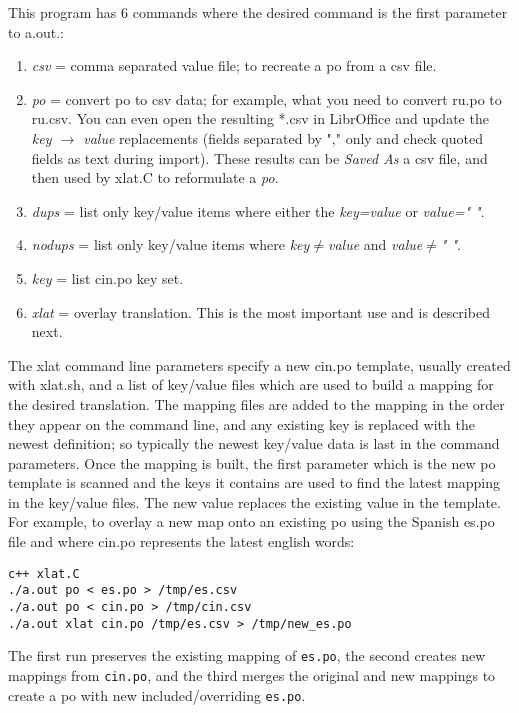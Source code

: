 This program has 6 commands where the desired command is the first parameter to a.out.:

\begin{enumerate}
	\item \textit{csv} = comma separated value file; to recreate a po from a csv file.
	\item \textit{po}  = convert po to csv data;  for example, what you need to convert ru.po to ru.csv.
	You can even open the resulting *.csv in LibrOffice and update the \textit{key $\rightarrow$ value} replacements
	(fields separated by "," only and check quoted fields as text during import).  These results can
	be \textit{Saved As} a csv file, and then used by xlat.C to reformulate a \textit{po}.
	\item \textit{dups} = list only key/value items where either the \textit{key=value} or \textit{value=" "}.
	\item \textit{nodups} = list only key/value items where \textit{key$\ne$value} and \textit{value$\ne$" "}.
	\item \textit{key} = list cin.po key set.
	\item \textit{xlat} = overlay translation.  This is the most important use and is described next.
\end{enumerate}

The xlat command line parameters specify a new cin.po template, usually created with xlat.sh, and a list of key/value files which are used to build a mapping for the desired translation.  The mapping files are added to the mapping in the order they appear on the command line, and any existing key is replaced with the newest definition; so typically the newest key/value data is last in the command parameters.  
Once the mapping is built, the first parameter which is the new po template is scanned and the keys it contains are used to find the latest mapping in the key/value files.  The new value replaces the existing value in the template.  For example, to overlay a new map onto an existing po using the Spanish es.po file and where cin.po represents the latest english words:

\begin{lstlisting}[numbers=none]
c++ xlat.C
./a.out po < es.po > /tmp/es.csv
./a.out po < cin.po > /tmp/cin.csv
./a.out xlat cin.po /tmp/es.csv > /tmp/new_es.po
\end{lstlisting}

The first run preserves the existing mapping of \texttt{es.po}, the second creates new mappings from \texttt{cin.po}, and the third merges the original and new mappings to create a po with new included/overriding \texttt{es.po}.

